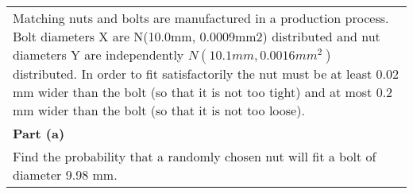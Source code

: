 \documentclass[a4paper,12pt]{article}
\begin{document}
\large
\begin{table}[ht!]
     \centering
     \begin{tabular}{|p{15cm}|}
     \hline        
Matching nuts and bolts are manufactured in a production process.  Bolt diameters X are N(10.0mm, 0.0009mm2) distributed and nut diameters Y are independently $N(10.1mm, 0.0016mm^2)$ distributed. In order to fit  satisfactorily the nut must be at least
0.02 mm wider than the bolt (so that it is not too tight) and at most 0.2 mm wider than
the bolt (so that it is not too loose).
\\
\noindent \textbf{Part (a)}\\
Find the probability that a randomly chosen nut will fit a bolt of diameter 9.98 mm.
\\ \hline
      \end{tabular}
    \end{table}
    
\end{document}

